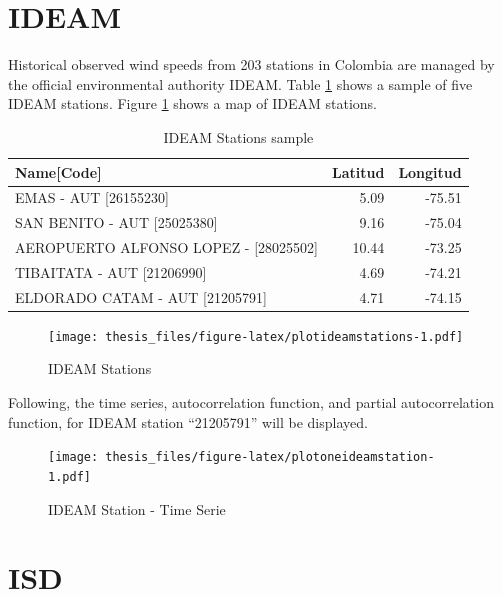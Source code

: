 \documentclass[12pt,oneside]{reedthesis}
\begin{document}
\hypertarget{ideam}{%
\section{IDEAM}\label{ideam}}

Historical observed wind speeds from 203 stations in Colombia are managed by the official environmental authority IDEAM. Table \ref{tab:tableideamstations} shows a sample of five IDEAM stations. Figure \ref{fig:plotideamstations} shows a map of IDEAM stations.
\begin{longtable}[t]{lrr}
\caption[IDEAM Stations]{\label{tab:tableideamstations}IDEAM Stations sample}\\
\toprule
Name[Code] & Latitud & Longitud\\
\midrule
EMAS - AUT [26155230] & 5.09 & -75.51\\
SAN BENITO - AUT [25025380] & 9.16 & -75.04\\
AEROPUERTO ALFONSO LOPEZ - [28025502] & 10.44 & -73.25\\
TIBAITATA - AUT [21206990] & 4.69 & -74.21\\
ELDORADO CATAM - AUT [21205791] & 4.71 & -74.15\\
\bottomrule
\end{longtable}
\begin{figure}
\centering
\texttt{[image: thesis\_files/figure-latex/plotideamstations-1.pdf]}
\caption{\label{fig:plotideamstations}IDEAM Stations}
\end{figure}
Following, the time series, autocorrelation function, and partial autocorrelation function, for IDEAM station ``21205791'' will be displayed.
\begin{figure}
\centering
\texttt{[image: thesis\_files/figure-latex/plotoneideamstation-1.pdf]}
\caption{\label{fig:plotoneideamstation}IDEAM Station - Time Serie}
\end{figure}
\hypertarget{isd}{%
\section{ISD}\label{isd}}
\end{document}
